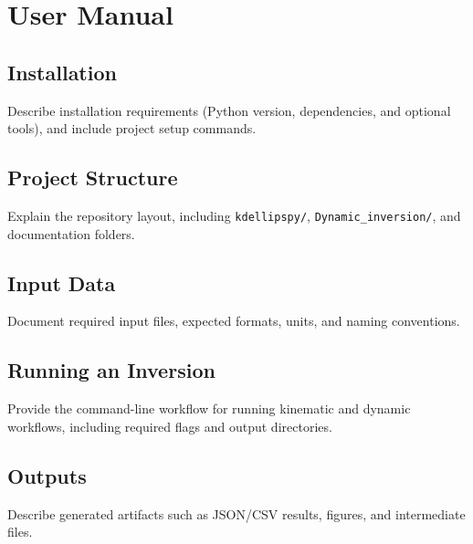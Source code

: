 \chapter{User Manual}

\section{Installation}
Describe installation requirements (Python version, dependencies, and optional tools), and include project setup commands.

\section{Project Structure}
Explain the repository layout, including \texttt{kdellipspy/}, \texttt{Dynamic\_inversion/}, and documentation folders.

\section{Input Data}
Document required input files, expected formats, units, and naming conventions.

\section{Running an Inversion}
Provide the command-line workflow for running kinematic and dynamic workflows, including required flags and output directories.

\section{Outputs}
Describe generated artifacts such as JSON/CSV results, figures, and intermediate files.

